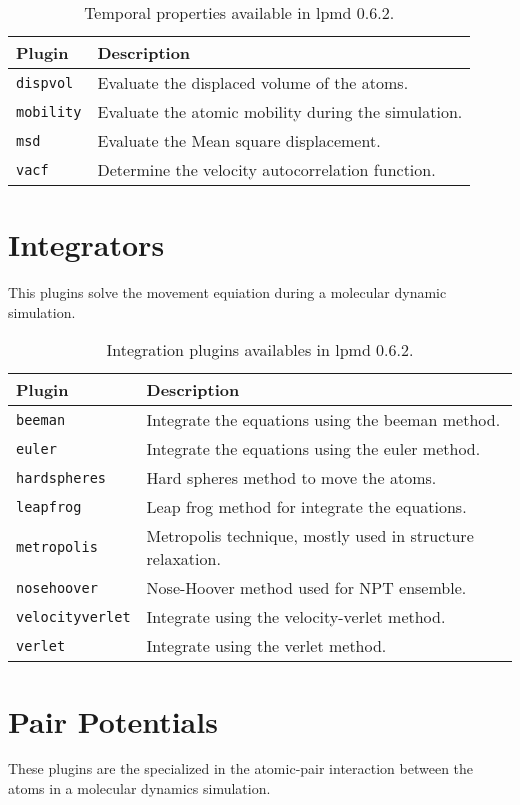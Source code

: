 \begin{table}[h!]\centering
 \begin{tabular}{|l|p{13cm}|}\hline
 Plugin & Description \\
 \hline
 \texttt{dispvol} & Evaluate the displaced volume of the atoms.\\
 \hline
 \texttt{mobility} & Evaluate the atomic mobility during the simulation.\\
 \hline
 \texttt{msd} & Evaluate the Mean square displacement.\\
 \hline
 \texttt{vacf} & Determine the velocity autocorrelation function.\\
 \hline
 \end{tabular}
\label{tab:modtempproper}
\caption{Temporal properties available in lpmd 0.6.2.}
\end{table}

\section{Integrators}
This plugins solve the movement equiation during a molecular dynamic simulation.

\begin{table}[h!]\centering
 \begin{tabular}{|l|p{13cm}|}\hline
 Plugin & Description \\
 \hline\hline
 \texttt{beeman} & Integrate the equations using the beeman method.\\
 \hline
 \texttt{euler} & Integrate the equations using the euler method.\\
 \hline
 \texttt{hardspheres} & Hard spheres method to move the atoms.\\
 \hline
 \texttt{leapfrog} & Leap frog method for integrate the equations.\\
 \hline
 \texttt{metropolis} & Metropolis technique, mostly used in structure
 relaxation.\\
 \hline
 \texttt{nosehoover} & Nose-Hoover method used for NPT ensemble.\\
 \hline
 \texttt{velocityverlet} & Integrate using the velocity-verlet method.\\
 \hline
 \texttt{verlet} & Integrate using the verlet method.\\
 \hline
 \end{tabular}
\label{tab:modinteg}
\caption{Integration plugins availables in lpmd 0.6.2.}
\end{table}

\section{Pair Potentials}
These plugins are the specialized in the atomic-pair interaction between the
atoms in a molecular dynamics simulation.


